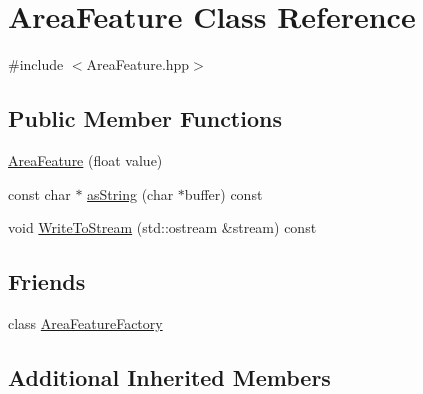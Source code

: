 \hypertarget{class_area_feature}{\section{Area\+Feature Class Reference}
\label{class_area_feature}
}


{\ttfamily \#include $<$Area\+Feature.\+hpp$>$}

\subsection*{Public Member Functions}
\begin{DoxyCompactItemize}
\item 
\hyperlink{class_area_feature_af65d43c5c868babfb6c429464f36a898}{Area\+Feature} (float value)
\item 
const char $\ast$ \hyperlink{class_area_feature_a6c0a6e3346ba2ddaa4a50cb957f08ab2}{as\+String} (char $\ast$buffer) const 
\item 
void \hyperlink{class_area_feature_ac0edad4aaa2a45caabd27112017bf4a6}{Write\+To\+Stream} (std\+::ostream \&stream) const 
\end{DoxyCompactItemize}
\subsection*{Friends}
\begin{DoxyCompactItemize}
\item 
class \hyperlink{class_area_feature_acf274ff5848a30a105c61f0e1c56cf7e}{Area\+Feature\+Factory}
\end{DoxyCompactItemize}
\subsection*{Additional Inherited Members}


